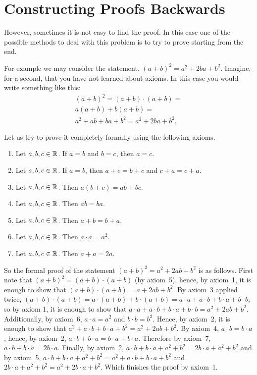 \section{Constructing Proofs Backwards}
However, sometimes it is not easy to find the proof. In this case one of the
possible methods to deal with this problem is to try to prove starting from
the end.

For example we may consider the statement. $(a + b)^2 = a^2 + 2ba + b^2$.
Imagine, for a second, that you have not learned about axioms.
In this case you would write something like this:
\begin{multline*}
    (a + b)^2 = (a + b) \cdot (a + b) = \\
    a (a + b) + b (a + b) = \\
    a^2 + ab + ba + b^2 = a^2 + 2ba + b^2.
\end{multline*}

Let us try to prove it completely formally using the following axioms.
\begin{enumerate}
  \item Let $a, b, c \in \mathbb{R}$. If $a = b$ and $b = c$, then $a = c$.
  \item Let $a, b, c \in \mathbb{R}$. If $a = b$, then $a + c = b + c$ and
    $c + a = c + a$.
  \item Let $a, b, c \in \mathbb{R}$. Then $a (b + c) = ab + bc$.
  \item Let $a, b, c \in \mathbb{R}$. Then $ab = ba$.
  \item Let $a, b, c \in \mathbb{R}$. Then $a + b = b + a$.
  \item Let $a, b, c \in \mathbb{R}$. Then $a \cdot a = a^2$.
  \item Let $a, b, c \in \mathbb{R}$. Then $a + a = 2a$.
\end{enumerate}
So the formal proof of the statement $(a + b)^2 = a^2 + 2ab + b^2$ is as
follows. First note that $(a + b)^2 = (a + b) \cdot (a + b)$ (by axiom~5),
hence, by axiom~1, it is enough to show that
$(a + b) \cdot (a + b) = a + 2ab + b^2$. By axiom~3 applied twice,
$(a + b) \cdot (a + b) = a \cdot (a + b) + b \cdot (a + b) =
a \cdot a + a \cdot b + b \cdot a + b \cdot b$; so by axiom 1, it is enough
to show that $a \cdot a + a \cdot b + b \cdot a + b \cdot b = a^2 + 2ab + b^2$.
Additionally, by axiom~6, $a \cdot a = a^2$ and $b \cdot b = b^2$. Hence, by
axiom~2, it is enough to show that
$a^2 + a \cdot b + b \cdot a + b^2 = a^2 + 2ab + b^2$. By axiom~4,
$a \cdot b = b \cdot a$, hence, by axiom~2,
$a \cdot b + b \cdot a = b \cdot a + b \cdot a$. Therefore by axiom~7,
$a \cdot b + b \cdot a = 2 b \cdot a$. Finally, by axiom~2,
$a \cdot b + b \cdot a + a^2 + b^2 = 2b \cdot a + a^2 + b^2$ and by axiom~5,
$a \cdot b + b \cdot a + a^2 + b^2 = a^2 + a \cdot b + b \cdot a + b^2$ and
$2b \cdot a + a^2 + b^2 =  a^2 + 2b \cdot a + b^2$. Which finishes the proof by
axiom~1.

